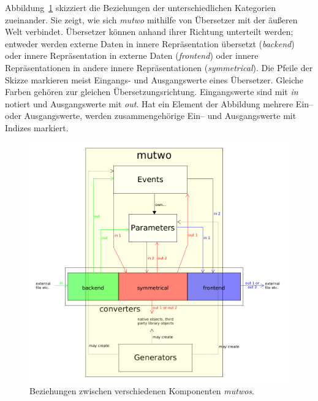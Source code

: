 \documentclass[12pt,a4paper,ngerman]{article}
\begin{document}
\vspace{0.2cm}
\bigskip

Abbildung~\ref{fig:mutwoStructure} skizziert die Beziehungen der unterschiedlichen Kategorien zueinander.
Sie zeigt, wie sich \emph{mutwo} mithilfe von Übersetzer mit der äußeren Welt verbindet.
Übersetzer können anhand ihrer Richtung unterteilt werden;
entweder werden externe Daten in innere Repräsentation übersetzt (\emph{backend}) oder innere Repräsentation in externe Daten (\emph{frontend}) oder innere Repräsentationen in andere innere Repräsentationen (\emph{symmetrical}).
Die Pfeile der Skizze markieren meist Eingangs- und Ausgangswerte eines Übersetzer.
Gleiche Farben gehören zur gleichen Übersetzungsrichtung.
Eingangswerte sind mit \emph{in} notiert und Ausgangswerte mit \emph{out}.
Hat ein Element der Abbildung mehrere Ein-- oder Ausgangswerte, werden zusammengehörige Ein-- und Ausgangswerte mit Indizes markiert.

\begin{figure}[H]
    \begin{center}
        \includegraphics[scale=0.38]{pictures/mutwo-structure.png}
    \end{center}
    \caption{%
        Beziehungen zwischen verschiedenen Komponenten \emph{mutwos}.
    }
    \label{fig:mutwoStructure}
\end{figure}
\end{document}

